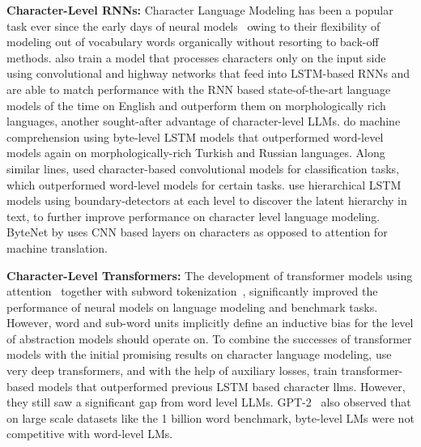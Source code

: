 \textbf{Character-Level RNNs:} Character Language Modeling has been a popular task ever since the early days of neural models~\citep{sutskever2011generating,mikolov2012subword,graves2013generating} owing to their flexibility of modeling out of vocabulary words organically without resorting to back-off methods. \cite{kim2016character} also train a model that processes characters only on the input side using convolutional and highway networks that feed into LSTM-based RNNs and are able to match performance with the RNN based state-of-the-art language models of the time on English and outperform them on morphologically rich languages, another sought-after advantage of character-level LLMs. \cite{kenter2018byte} do machine comprehension using byte-level LSTM models that outperformed word-level models again on morphologically-rich Turkish and Russian languages. Along similar lines, \cite{zhang2015character} used character-based convolutional models for classification tasks, which outperformed word-level models for certain tasks. \citet{chung2019hierarchical} use hierarchical LSTM models using boundary-detectors at each level to discover the latent hierarchy in text, to further improve performance on character level language modeling. ByteNet by \cite{kalchbrenner2016neural} uses CNN based layers on characters as opposed to attention for machine translation. 

\textbf{Character-Level Transformers:} The development of transformer models using attention~\citep{vaswani2017attention} together with subword tokenization~\citep{sennrich-etal-2016-neural}, significantly improved the performance of neural models on language modeling and benchmark tasks. However, word and sub-word units implicitly define an inductive bias for the level of abstraction models should operate on. To combine the successes of transformer models with the initial promising results on character language modeling, \citet{al2019character} use very deep transformers, and with the help of auxiliary losses, train transformer-based models that outperformed previous LSTM based character llms. However, they still saw a significant gap from word level LLMs. GPT-2~\citep{radfordgpt2} also observed that on large scale datasets like the 1 billion word benchmark, byte-level LMs were not competitive with word-level LMs. 

